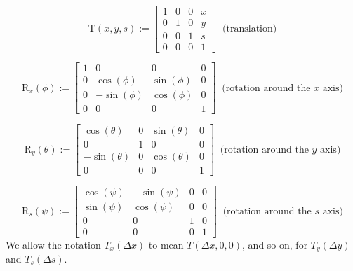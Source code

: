 \[
	\mathrm{T}(x, y, s) := \begin{bmatrix}
		1 & 0 & 0 & x \\
		0 & 1 & 0 & y \\
		0 & 0 & 1 & s \\
		0 & 0 & 0 & 1
	\end{bmatrix} \;\;\text{(translation)}
\]

\[
	\mathrm{R}_x(\phi) := \begin{bmatrix}
		1 & 0 & 0 & 0 \\
		0 & \cos(\phi) & \sin(\phi) & 0 \\
		0 & -\sin(\phi) & \cos(\phi) & 0 \\
		0 & 0 & 0 & 1
	\end{bmatrix} \;\;\text{(rotation around the $x$ axis)}
\]

\[
	\mathrm{R}_y(\theta) := \begin{bmatrix}
		\cos(\theta) & 0 & \sin(\theta) & 0 \\
		0 & 1 & 0 & 0 \\
		-\sin(\theta) & 0 & \cos(\theta) & 0 \\
		0 & 0 & 0 & 1
	\end{bmatrix} \;\;\text{(rotation around the $y$ axis)}
\]

\[
	\mathrm{R}_s(\psi) := \begin{bmatrix}
		\cos(\psi) & -\sin(\psi) & 0 & 0 \\
		\sin(\psi) & \cos(\psi) & 0 & 0 \\
		0 & 0 & 1 & 0 \\
		0 & 0 & 0 & 1
	\end{bmatrix} \;\;\text{(rotation around the $s$ axis)}
\]
We allow the notation $T_x(\Delta x)$ to mean $T(\Delta x, 0, 0)$, and so on, for $T_y(\Delta y)$ and $T_s(\Delta s)$.


